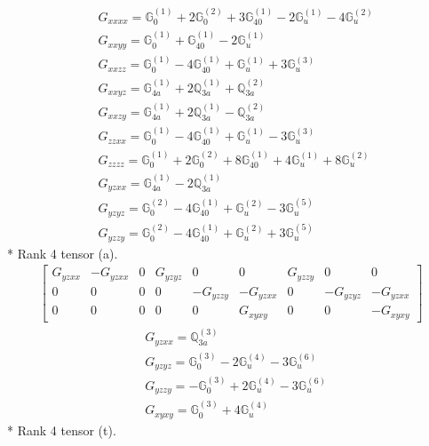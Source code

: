 \documentclass[fleqn,8pt,landscape]{jsarticle}
\begin{document}
\begin{align*}
& G_{xxxx} = \mathbb{G}_{0}^{(1)} + 2 \mathbb{G}_{0}^{(2)} + 3 \mathbb{G}_{40}^{(1)} - 2 \mathbb{G}_{u}^{(1)} - 4 \mathbb{G}_{u}^{(2)} \\
& G_{xxyy} = \mathbb{G}_{0}^{(1)} + \mathbb{G}_{40}^{(1)} - 2 \mathbb{G}_{u}^{(1)} \\
& G_{xxzz} = \mathbb{G}_{0}^{(1)} - 4 \mathbb{G}_{40}^{(1)} + \mathbb{G}_{u}^{(1)} + 3 \mathbb{G}_{u}^{(3)} \\
& G_{xxyz} = \mathbb{G}_{4a}^{(1)} + 2 \mathbb{Q}_{3a}^{(1)} + \mathbb{Q}_{3a}^{(2)} \\
& G_{xxzy} = \mathbb{G}_{4a}^{(1)} + 2 \mathbb{Q}_{3a}^{(1)} - \mathbb{Q}_{3a}^{(2)} \\
& G_{zzxx} = \mathbb{G}_{0}^{(1)} - 4 \mathbb{G}_{40}^{(1)} + \mathbb{G}_{u}^{(1)} - 3 \mathbb{G}_{u}^{(3)} \\
& G_{zzzz} = \mathbb{G}_{0}^{(1)} + 2 \mathbb{G}_{0}^{(2)} + 8 \mathbb{G}_{40}^{(1)} + 4 \mathbb{G}_{u}^{(1)} + 8 \mathbb{G}_{u}^{(2)} \\
& G_{yzxx} = \mathbb{G}_{4a}^{(1)} - 2 \mathbb{Q}_{3a}^{(1)} \\
& G_{yzyz} = \mathbb{G}_{0}^{(2)} - 4 \mathbb{G}_{40}^{(1)} + \mathbb{G}_{u}^{(2)} - 3 \mathbb{G}_{u}^{(5)} \\
& G_{yzzy} = \mathbb{G}_{0}^{(2)} - 4 \mathbb{G}_{40}^{(1)} + \mathbb{G}_{u}^{(2)} + 3 \mathbb{G}_{u}^{(5)}
\end{align*}
* Rank 4 tensor (a).
\begin{align*}
\begin{bmatrix} G_{yzxx} & - G_{yzxx} & 0 & G_{yzyz} & 0 & 0 & G_{yzzy} & 0 & 0 \\ 0 & 0 & 0 & 0 & - G_{yzzy} & - G_{yzxx} & 0 & - G_{yzyz} & - G_{yzxx} \\ 0 & 0 & 0 & 0 & 0 & G_{xyxy} & 0 & 0 & - G_{xyxy} \end{bmatrix}
\end{align*}
\begin{align*}
& G_{yzxx} = \mathbb{Q}_{3a}^{(3)} \\
& G_{yzyz} = \mathbb{G}_{0}^{(3)} - 2 \mathbb{G}_{u}^{(4)} - 3 \mathbb{G}_{u}^{(6)} \\
& G_{yzzy} = - \mathbb{G}_{0}^{(3)} + 2 \mathbb{G}_{u}^{(4)} - 3 \mathbb{G}_{u}^{(6)} \\
& G_{xyxy} = \mathbb{G}_{0}^{(3)} + 4 \mathbb{G}_{u}^{(4)}
\end{align*}
* Rank 4 tensor (t).
\end{document}
